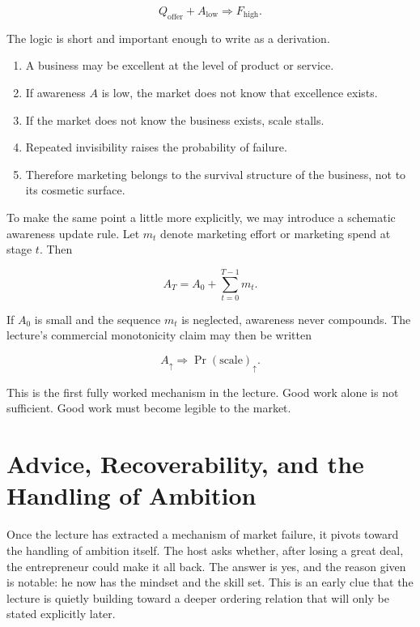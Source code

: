 \begin{equation}
Q_{\text{offer}} + A_{\text{low}} \Rightarrow F_{\text{high}}.
\end{equation}

The logic is short and important enough to write as a derivation.

\begin{enumerate}
\item A business may be excellent at the level of product or service.
\item If awareness \(A\) is low, the market does not know that excellence exists.
\item If the market does not know the business exists, scale stalls.
\item Repeated invisibility raises the probability of failure.
\item Therefore marketing belongs to the survival structure of the business, not to its cosmetic surface.
\end{enumerate}

To make the same point a little more explicitly, we may introduce a schematic awareness update rule. Let \(m_t\) denote marketing effort or marketing spend at stage \(t\). Then

\begin{equation}
A_T = A_0 + \sum_{t=0}^{T-1} m_t.
\end{equation}

If \(A_0\) is small and the sequence \(m_t\) is neglected, awareness never compounds. The lecture's commercial monotonicity claim may then be written

\begin{equation}
A_{\uparrow} \Rightarrow \Pr(\text{scale})_{\uparrow}.
\end{equation}

This is the first fully worked mechanism in the lecture. Good work alone is not sufficient. Good work must become legible to the market.

\section{Advice, Recoverability, and the Handling of Ambition}

Once the lecture has extracted a mechanism of market failure, it pivots toward the handling of ambition itself. The host asks whether, after losing a great deal, the entrepreneur could make it all back. The answer is yes, and the reason given is notable: he now has the mindset and the skill set. This is an early clue that the lecture is quietly building toward a deeper ordering relation that will only be stated explicitly later.

